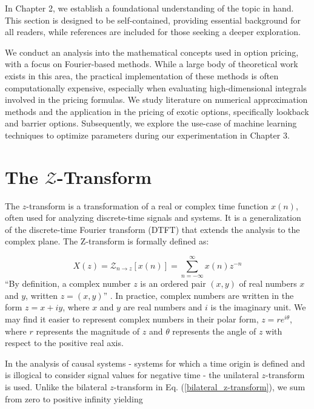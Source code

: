 \documentclass[a4paper]{report}
\begin{document}
In Chapter 2, we establish a foundational understanding of the topic in hand. This section is designed to be self-contained, providing essential background for all readers, while references are included for those seeking a deeper exploration.

We conduct an analysis into the mathematical concepts used in option pricing, with a focus on Fourier-based methods. While a large body of theoretical work exists in this area, the practical implementation of these methods is often computationally expensive, especially when evaluating high-dimensional integrals involved in the pricing formulas. We study literature on numerical approximation methods and the application in the pricing of exotic options, specifically lookback and barrier options. Subsequently, we explore the use-case of machine learning techniques to optimize parameters during our experimentation in Chapter 3.

\section{The \texorpdfstring{$\mathcal{Z}$}{Lg}-Transform}\label{z_transform}

The $z$-transform is a transformation of a real or complex time function $x(n)$, often used for analyzing discrete-time signals and systems. It is a generalization of the discrete-time Fourier transform (DTFT) that extends the analysis to the complex plane. The Z-transform is formally defined as:

\begin{equation}\label{bilateral_z-transform}
X(z) = \mathcal{Z}_{n \rightarrow z}[x(n)] = \sum^{\infty}_{n = -\infty} x(n)z^{-n}
\end{equation}
``By definition, a complex number $z$ is an ordered pair $(x, y)$ of real numbers $x$ and $y$, written $z = (x, y)$'' \citep{kreyszig2010advanced}. In practice, complex numbers are written in the form $z = x + iy$, where $x$ and $y$ are real numbers and $i$ is the imaginary unit. We may find it easier to represent complex numbers in their polar form, $z = re^{i\theta}$, where $r$ represents the magnitude of $z$ and $\theta$ represents the angle of $z$ with respect to the positive real axis.

In the analysis of causal systems - systems for which a time origin is defined and is illogical to consider signal values for negative time - the unilateral $z$-transform is used. Unlike the bilateral $z$-transform in Eq. (\ref{bilateral_z-transform}), we sum from zero to positive infinity yielding
\end{document}
